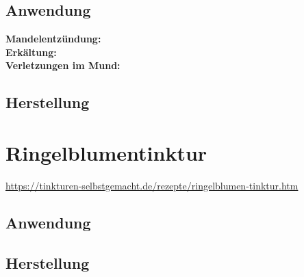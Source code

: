 
  

\subsection{Anwendung}
\textbf{Mandelentzündung:} \\

\textbf{Erkältung:} \\ 

\textbf{Verletzungen im Mund:} \\

\subsection{Herstellung}




\newpage



\section{Ringelblumentinktur}


\cite{tinkturen}

\url{https://tinkturen-selbstgemacht.de/rezepte/ringelblumen-tinktur.htm}


\subsection{Anwendung} 
\subsection{Herstellung}




\newpage



